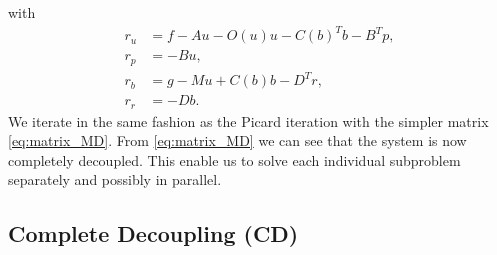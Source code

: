 with
\begin{align*}
r_u &= f- Au -O(u)u - C(b)^T b- B^T p,\\[0.1cm]
r_p &=-B u,\\[0.1cm]
r_b &=g-Mu+C(b)b-D^T r,\\[0.1cm]
r_r &=-D b.
\end{align*}
We iterate in the same fashion as the Picard iteration with the simpler matrix \eqref{eq:matrix_MD}. From \eqref{eq:matrix_MD} we can see that the system is now completely decoupled. This enable us to  solve each individual subproblem separately and possibly in parallel.

\subsection{Complete Decoupling (CD)}
\label{sec:FEMcd}

